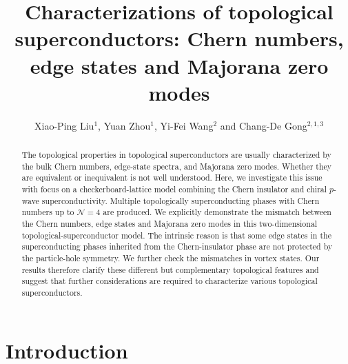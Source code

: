 \documentclass[12pt]{iopart}
\begin{document}
\title[]{Characterizations of topological superconductors: Chern numbers, edge states and Majorana zero modes}


\author{Xiao-Ping Liu$^1$, Yuan Zhou$^{1}$, Yi-Fei Wang$^2$
and Chang-De Gong$^{2,1,3}$}

\address{$^1$National Laboratory of Solid State Microstructures and
Department of Physics, Nanjing University, Nanjing 210093, China}
\address{$^2$Center for Statistical and Theoretical Condensed
Matter Physics, and Department of Physics, Zhejiang Normal
University, Jinhua 321004, China}
\address{$^3$Collaborative Innovation Center of Advanced Microstructures, Nanjing University, Nanjing 210093, China
}



\begin{abstract}
The topological properties in topological superconductors are usually characterized by the bulk Chern numbers, edge-state spectra, and Majorana zero modes. Whether they are equivalent or inequivalent is not well understood. Here, we investigate this issue with focus on a checkerboard-lattice model combining the Chern insulator and chiral $p$-wave superconductivity. Multiple topologically superconducting phases with Chern numbers up to $\mathcal{N}=4$ are produced. We explicitly demonstrate the mismatch between the Chern numbers, edge states and Majorana zero modes in this two-dimensional topological-superconductor model. The intrinsic reason is that some edge states in the superconducting phases inherited from the Chern-insulator phase are not protected by the particle-hole symmetry. We further check the mismatches in vortex states. Our results therefore clarify these different but complementary topological features and suggest that further considerations are required to characterize various topological superconductors.
\end{abstract}

\maketitle

\section{Introduction}
\end{document}
